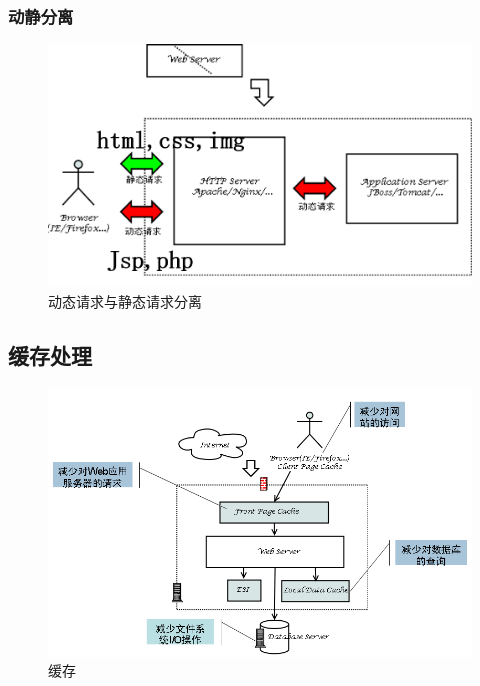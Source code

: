 \documentclass[UTF8,a4paper,12pt]{ctexbook}
\begin{document}
			\subsubsection{动静分离}	
				\begin{figure}[ht]
					\centering
					\includegraphics[width=0.7\linewidth]{figures/web-Server}
					\caption{动态请求与静态请求分离}
					\label{fig:web-server}
				\end{figure}
		\subsection{缓存处理}
			\begin{figure}[ht]
				\centering
				\includegraphics[width=0.7\linewidth]{figures/server-cache}
				\caption{缓存}
				\label{fig:server-cache}
			\end{figure}
		
\end{document}
